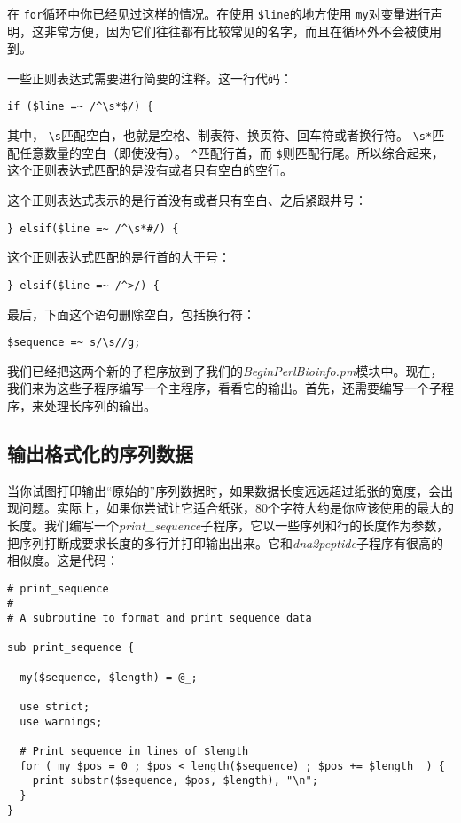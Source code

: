 在 \verb|for|循环中你已经见过这样的情况。在使用 \verb|$line|的地方使用 \verb|my|对变量进行声明，这非常方便，因为它们往往都有比较常见的名字，而且在循环外不会被使用到。

一些正则表达式需要进行简要的注释。这一行代码：

\begin{lstlisting}
if ($line =~ /^\s*$/) {
\end{lstlisting}

其中， \verb|\s|匹配空白，也就是空格、制表符、换页符、回车符或者换行符。 \verb|\s*|匹配任意数量的空白（即使没有）。 \verb|^|匹配行首，而 \verb|$|则匹配行尾。所以综合起来，这个正则表达式匹配的是没有或者只有空白的空行。

这个正则表达式表示的是行首没有或者只有空白、之后紧跟井号：

\begin{lstlisting}
} elsif($line =~ /^\s*#/) {
\end{lstlisting}

这个正则表达式匹配的是行首的大于号：

\begin{lstlisting}
} elsif($line =~ /^>/) {
\end{lstlisting}

最后，下面这个语句删除空白，包括换行符：

\begin{lstlisting}
$sequence =~ s/\s//g;
\end{lstlisting}

我们已经把这两个新的子程序放到了我们的\textit{BeginPerlBioinfo.pm}模块中。现在，我们来为这些子程序编写一个主程序，看看它的输出。首先，还需要编写一个子程序，来处理长序列的输出。

\subsection{输出格式化的序列数据}
当你试图打印输出“原始的”序列数据时，如果数据长度远远超过纸张的宽度，会出现问题。实际上，如果你尝试让它适合纸张，80个字符大约是你应该使用的最大的长度。我们编写一个\textit{print\_sequence}子程序，它以一些序列和行的长度作为参数，把序列打断成要求长度的多行并打印输出出来。它和\textit{dna2peptide}子程序有很高的相似度。这是代码：

\begin{lstlisting}
# print_sequence
#
# A subroutine to format and print sequence data 

sub print_sequence {
  
  my($sequence, $length) = @_;

  use strict;
  use warnings;

  # Print sequence in lines of $length
  for ( my $pos = 0 ; $pos < length($sequence) ; $pos += $length  ) {
    print substr($sequence, $pos, $length), "\n";
  }
}
\end{lstlisting}

